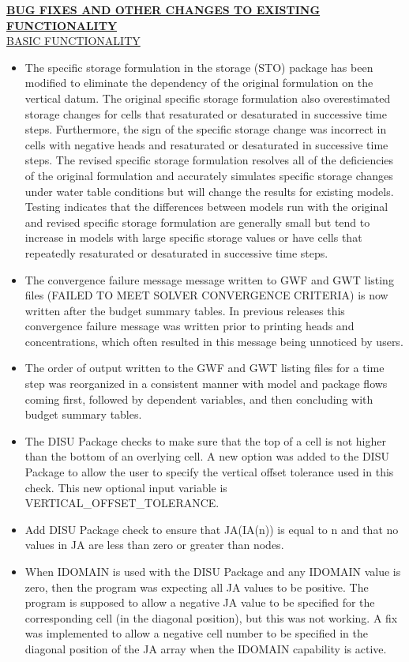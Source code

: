 	\textbf{\underline{BUG FIXES AND OTHER CHANGES TO EXISTING FUNCTIONALITY}} \\
	\underline{BASIC FUNCTIONALITY}
	\begin{itemize}
		\item The specific storage formulation in the storage (STO) package has been modified to eliminate the dependency of the original formulation on the vertical datum. The original specific storage formulation also overestimated storage changes for cells that resaturated or desaturated in successive time steps. Furthermore, the sign of the specific storage change was incorrect in cells with negative heads and resaturated or desaturated in successive time steps. The revised specific storage formulation resolves all of the deficiencies of the original formulation and accurately simulates specific storage changes under water table conditions but will change the results for existing models. Testing indicates that the differences between models run with the original and revised specific storage formulation are generally small but tend to increase in models with large specific storage values or have cells that repeatedly resaturated or desaturated in successive time steps.
		\item The convergence failure message message written to GWF and GWT listing files (FAILED TO MEET SOLVER CONVERGENCE CRITERIA) is now written after the budget summary tables.  In previous releases this convergence failure message was written prior to printing heads and concentrations, which often resulted in this message being unnoticed by users.
	        \item The order of output written to the GWF and GWT listing files for a time step was reorganized in a consistent manner with model and package flows coming first, followed by dependent variables, and then concluding with budget summary tables.
	        \item The DISU Package checks to make sure that the top of a cell is not higher than the bottom of an overlying cell.  A new option was added to the DISU Package to allow the user to specify the vertical offset tolerance used in this check.  This new optional input variable is VERTICAL\_OFFSET\_TOLERANCE.
	        \item Add DISU Package check to ensure that JA(IA(n)) is equal to n and that no values in JA are less than zero or greater than nodes.
	        \item When IDOMAIN is used with the DISU Package and any IDOMAIN value is zero, then the program was expecting all JA values to be positive. The program is supposed to allow a negative JA value to be specified for the corresponding cell (in the diagonal position), but this was not working.  A fix was implemented to allow a negative cell number to be specified in the diagonal position of the JA array when the IDOMAIN capability is active.

\end{itemize}
